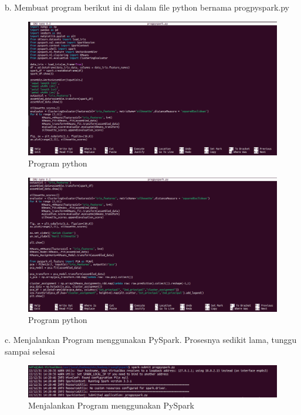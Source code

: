 \begin{enumerate}
b. Membuat program berikut ini di dalam file python bernama progpyspark.py
\begin{figure}[!ht]
\includegraphics[width=\textwidth]{TugasKelompok/Kelompok1/prog1_1}
\caption{Program python}
\label{gam:prog1_1}
\end{figure} 

\newpage
\begin{figure}[!ht]
\includegraphics[width=\textwidth]{TugasKelompok/Kelompok1/prog1_2}
\caption{Program python}
\label{gam:prog1_2}
\end{figure}


c. Menjalankan Program menggunakan PySpark. Prosesnya sedikit lama, tunggu sampai selesai
\begin{figure}[!ht]
\includegraphics[width=\textwidth]{TugasKelompok/Kelompok1/perintah-spark-submit}
\caption{Menjalankan Program menggunakan PySpark}
\label{gam:perintah-spark-submit}
\end{figure}


\end{enumerate}
